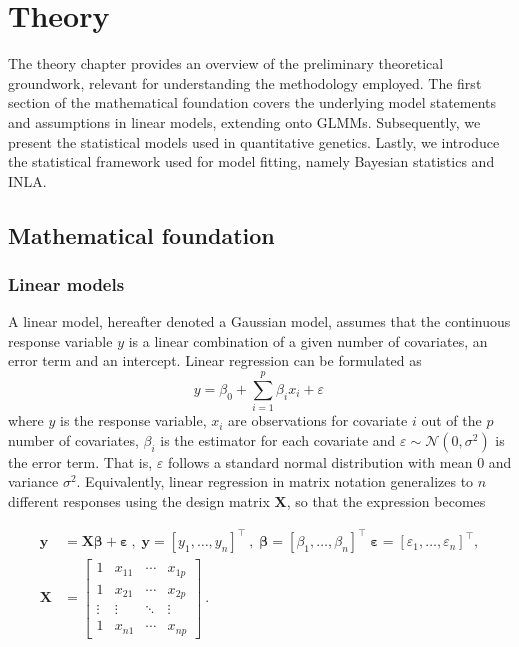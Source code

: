 \chapter{Theory}

The theory chapter provides an overview of the preliminary theoretical groundwork, relevant for understanding the methodology employed. The first section of the mathematical foundation covers the underlying model statements and assumptions in linear models, extending onto GLMMs. Subsequently, we present the statistical models used in quantitative genetics. Lastly, we introduce the statistical framework used for model fitting, namely Bayesian statistics and INLA. 

\section{Mathematical foundation} 

\subsection{Linear models}
\label{sec:theory:linear model}
A linear model, hereafter denoted a Gaussian model, assumes that the continuous response variable $y$ is a linear combination of a given number of covariates, an error term and an intercept. Linear regression can be formulated as
\begin{equation}
y = \beta_0 + \sum_{i=1}^p \beta_i x_i + \varepsilon \,    
\label{eq:lin.reg scalar expression}
\end{equation}
where $y$ is the response variable, $x_i$ are observations for covariate $i$ out of the $p$ number of covariates, $\beta_i$ is the estimator for each covariate and $\varepsilon \sim \mathcal{N}(0,\sigma^2)$ is the error term. That is, $\varepsilon$ follows a standard normal distribution with mean $0$ and variance $\sigma^2$. Equivalently, linear regression in matrix notation generalizes to $n$ different responses using the design matrix $\bm X$, so that the expression becomes

\begin{align}
\label{eq:linear regression matrix}
\bm y &= \bm X \bm \beta + \bm \varepsilon \ , \; 
\bm y = [y_1, \dots, y_n]^\top \ , \; 
\bm \beta = [\beta_1, \dots, \beta_n]^\top \;
\bm \varepsilon = [\varepsilon_1, \dots, \varepsilon_n]^\top, \\
\bm X &= \begin{bmatrix}
1       & x_{11} & \cdots & x_{1p} \\
1       & x_{21} & \cdots & x_{2p} \\
\vdots  & \vdots & \ddots & \vdots \\
1       & x_{n1} & \cdots & x_{np} \nonumber
\end{bmatrix} \ .
\end{align}

